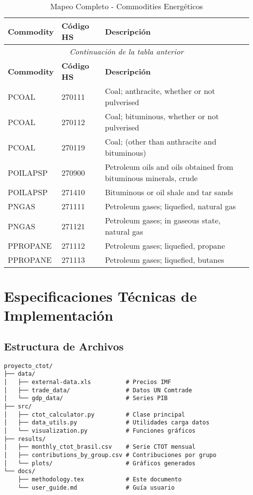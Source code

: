 \documentclass[12pt,a4paper]{article}
\begin{document}
\begin{longtable}{p{3cm}p{2cm}p{8cm}}
\caption{Mapeo Completo - Commodities Energéticos} \\
\toprule
\textbf{Commodity} & \textbf{Código HS} & \textbf{Descripción} \\
\midrule
\endfirsthead
\multicolumn{3}{c}{\textit{Continuación de la tabla anterior}} \\
\toprule
\textbf{Commodity} & \textbf{Código HS} & \textbf{Descripción} \\
\midrule
\endhead
PCOAL & 270111 & Coal; anthracite, whether or not pulverised \\
PCOAL & 270112 & Coal; bituminous, whether or not pulverised \\
PCOAL & 270119 & Coal; (other than anthracite and bituminous) \\
POILAPSP & 270900 & Petroleum oils and oils obtained from bituminous minerals, crude \\
POILAPSP & 271410 & Bituminous or oil shale and tar sands \\
PNGAS & 271111 & Petroleum gases; liquefied, natural gas \\
PNGAS & 271121 & Petroleum gases; in gaseous state, natural gas \\
PPROPANE & 271112 & Petroleum gases; liquefied, propane \\
PPROPANE & 271113 & Petroleum gases; liquefied, butanes \\
\bottomrule
\end{longtable}

\section{Especificaciones Técnicas de Implementación}

\subsection{Estructura de Archivos}

\begin{lstlisting}[caption=Estructura del Proyecto]
proyecto_ctot/
├── data/
│   ├── external-data.xls          # Precios IMF
│   ├── trade_data/                # Datos UN Comtrade
│   └── gdp_data/                  # Series PIB
├── src/
│   ├── ctot_calculator.py         # Clase principal
│   ├── data_utils.py              # Utilidades carga datos
│   └── visualization.py           # Funciones gráficos
├── results/
│   ├── monthly_ctot_brasil.csv    # Serie CTOT mensual
│   ├── contributions_by_group.csv # Contribuciones por grupo
│   └── plots/                     # Gráficos generados
└── docs/
    ├── methodology.tex            # Este documento
    └── user_guide.md              # Guía usuario
\end{lstlisting}
\end{document}
